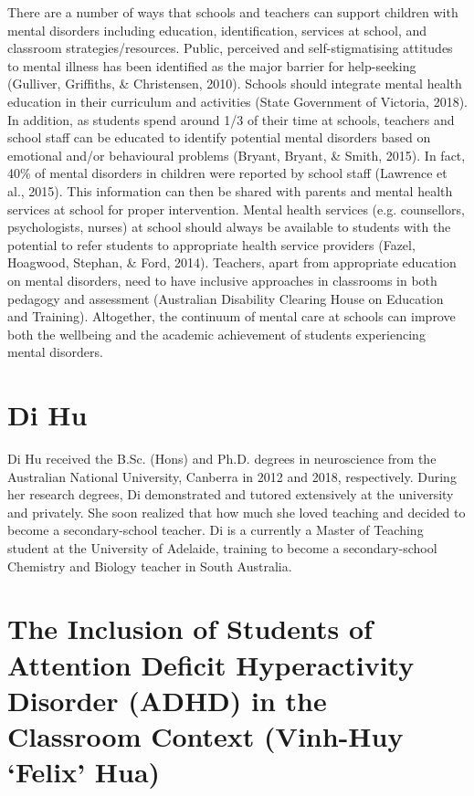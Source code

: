 \documentclass[twoside,12pt,a4paper,notitlepage]{memoir}
\begin{document}
There are a number of ways that schools and teachers can support children with mental disorders including education, identification, services at school, and classroom strategies/resources. Public, perceived and self-stigmatising attitudes to mental illness has been identified as the major barrier for help-seeking (Gulliver, Griffiths, \& Christensen, 2010). Schools should integrate mental health education in their curriculum and activities (State Government of Victoria, 2018). In addition, as students spend around 1/3 of their time at schools, teachers and school staff can be educated to identify potential mental disorders based on emotional and/or behavioural problems (Bryant, Bryant, \& Smith, 2015). In fact, 40\% of mental disorders in children were reported by school staff (Lawrence et al., 2015). This information can then be shared with parents and mental health services at school for proper intervention. Mental health services (e.g. counsellors, psychologists, nurses) at school should always be available to students with the potential to refer students to appropriate health service providers (Fazel, Hoagwood, Stephan, \& Ford, 2014). Teachers, apart from appropriate education on mental disorders, need to have inclusive approaches in classrooms in both pedagogy and assessment (Australian Disability Clearing House on Education and Training). Altogether, the continuum of mental care at schools can improve both the wellbeing and the academic achievement of students experiencing mental disorders.

\section*{Di Hu}

Di Hu received the B.Sc. (Hons) and Ph.D. degrees in neuroscience from the
Australian National University, Canberra in 2012 and 2018,
respectively. During her research degrees, Di demonstrated and tutored
extensively at the university and privately. She soon realized that how much
she loved teaching and decided to become a secondary-school teacher.
Di is a currently a Master of Teaching student at the University of Adelaide,
training to become a secondary-school Chemistry and Biology teacher in South
Australia.



\pagebreak
\section*{The Inclusion of Students of Attention Deficit Hyperactivity Disorder (ADHD) in the Classroom Context (Vinh-Huy `Felix' Hua)}
\label{aut:hua}
\end{document}
